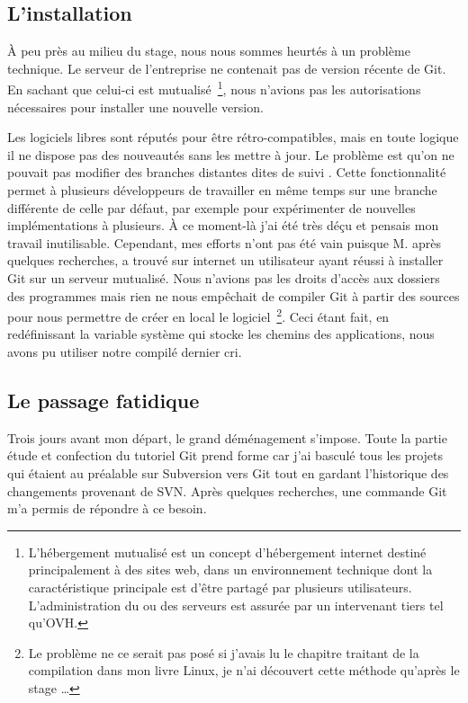 \subsection{L'installation} %

À peu près au milieu du stage, nous nous sommes heurtés à un problème
technique. Le serveur de l'entreprise ne contenait pas de version récente de
Git. En sachant que celui-ci est mutualisé\, \footnote{L'hébergement mutualisé
est un concept d'hébergement internet destiné principalement à des sites web,
dans un environnement technique dont la caractéristique principale est d'être
partagé par plusieurs utilisateurs. L'administration du ou des serveurs est
assurée par un intervenant tiers tel qu'OVH.}, nous n'avions pas les
autorisations nécessaires pour installer une nouvelle version.

Les logiciels libres sont réputés pour être rétro-compatibles, mais en toute
logique il ne dispose pas des nouveautés sans les mettre à jour. Le problème
est qu'on ne pouvait pas modifier des branches distantes dites \og de suivi
\fg{}. Cette fonctionnalité permet à plusieurs développeurs de travailler en
même temps sur une branche différente de celle par défaut, par exemple pour
expérimenter de nouvelles implémentations à plusieurs. À ce moment-là j'ai été
très déçu et pensais mon travail inutilisable. Cependant, mes efforts n'ont pas
été vain puisque M. après quelques recherches, a trouvé sur
internet un utilisateur ayant réussi à installer Git sur un serveur mutualisé.
Nous n'avions pas les droits d'accès aux dossiers des programmes mais rien ne
nous empêchait de compiler Git à partir des sources pour nous permettre de
créer en local le logiciel\, \footnote{Le problème ne ce serait pas posé si
j'avais lu le chapitre traitant de la compilation dans mon livre Linux, je n'ai
découvert cette méthode qu'après le stage \ldots{}}. Ceci étant fait, en
redéfinissant la variable système qui stocke les chemins des applications, nous
avons pu utiliser notre compilé dernier cri.


\subsection{Le passage fatidique} %

Trois jours avant mon départ, le grand déménagement s'impose. Toute la partie
étude et confection du tutoriel Git prend forme car j'ai basculé tous les
projets qui étaient au préalable sur Subversion vers Git tout en gardant
l'historique des changements provenant de SVN. Après quelques recherches, une
commande Git m'a permis de répondre à ce besoin.

